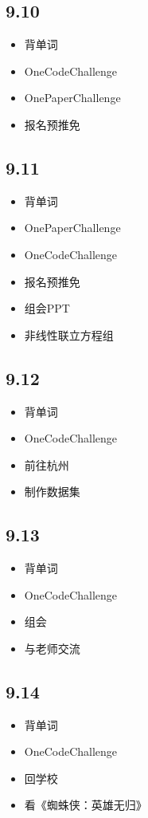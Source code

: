 \documentclass[UTF8]{ctexart}
\begin{document}
\subsection*{9.10}
\begin{itemize}
    \item 背单词
    \item OneCodeChallenge
    \item OnePaperChallenge
    \item 报名预推免
\end{itemize}

\subsection*{9.11}
\begin{itemize}
    \item 背单词
    \item OnePaperChallenge
    \item OneCodeChallenge
    \item 报名预推免
    \item 组会PPT
    \item 非线性联立方程组
\end{itemize}

\subsection*{9.12}
\begin{itemize}
    \item 背单词
    \item OneCodeChallenge
    \item 前往杭州
    \item 制作数据集
\end{itemize}

\subsection*{9.13}
\begin{itemize}
    \item 背单词
    \item OneCodeChallenge
    \item 组会
    \item 与老师交流
\end{itemize}

\subsection*{9.14}
\begin{itemize}
    \item 背单词
    \item OneCodeChallenge
    \item 回学校
    \item 看《蜘蛛侠：英雄无归》
\end{itemize}
\end{document}
